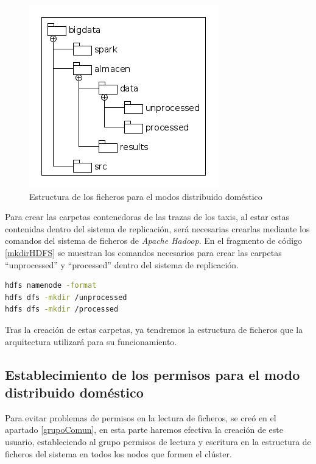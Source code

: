 \begin{figure}[htp!]
\centering
\caption{Estructura de los ficheros para el modos distribuido doméstico}
\label{fig:fichConRepli}
\includegraphics[scale=0.7]{diagramas/fichConRepli}
\end{figure}
 
Para crear las carpetas contenedoras de las trazas de los taxis, al estar estas contenidas dentro del sistema de replicación, será necesarias crearlas mediante los comandos del sistema de ficheros de \textit{Apache Hadoop}. En el fragmento de código \ref{mkdirHDFS} se muestran los comandos necesarios para crear las carpetas ``unprocessed'' y ``processed'' dentro del sistema de replicación.

\begin{lstlisting}[label=mkdirHDFS,language=sh,frame=single,caption=Comandos para crear las carpetas de datos en el \gls{HDFS}]
hdfs namenode -format
hdfs dfs -mkdir /unprocessed
hdfs dfs -mkdir /processed
\end{lstlisting}

Tras la creación de estas carpetas, ya tendremos la estructura de ficheros que la arquitectura utilizará para su funcionamiento.

\subsection{Establecimiento de los permisos para el modo distribuido doméstico}
Para evitar problemas de permisos en la lectura de ficheros, se creó en el apartado \ref{grupoComun}, en esta parte haremos efectiva la creación de este usuario, estableciendo al grupo permisos de lectura y escritura en la estructura de ficheros del sistema en todos los nodos que formen el clúster.

